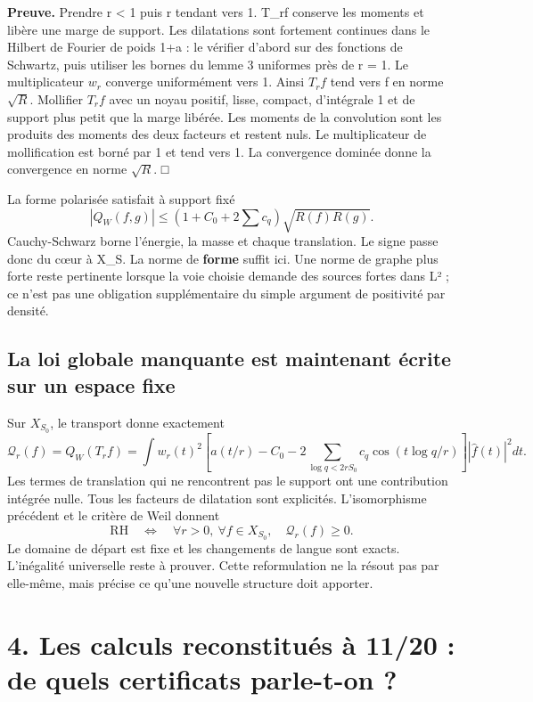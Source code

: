 \documentclass[
  10pt,
  a4paper,
]{article}
\begin{document}
\textbf{Preuve.} Prendre r \textless{} 1 puis r tendant vers 1. T\_rf
conserve les moments et libère une marge de support. Les dilatations
sont fortement continues dans le Hilbert de Fourier de poids 1+a : le
vérifier d'abord sur des fonctions de Schwartz, puis utiliser les bornes
du lemme 3 uniformes près de r = 1. Le multiplicateur \(w_r\) converge
uniformément vers 1. Ainsi \(T_rf\) tend vers f en norme \(\sqrt R\).
Mollifier \(T_rf\) avec un noyau positif, lisse, compact, d'intégrale 1
et de support plus petit que la marge libérée. Les moments de la
convolution sont les produits des moments des deux facteurs et restent
nuls. Le multiplicateur de mollification est borné par 1 et tend vers 1.
La convergence dominée donne la convergence en norme \(\sqrt R\). □

La forme polarisée satisfait à support fixé \[
|Q_W(f,g)|\le(1+C_0+2\sum c_q)\sqrt{R(f)R(g)}.
\] Cauchy-Schwarz borne l'énergie, la masse et chaque translation. Le
signe passe donc du cœur à X\_S. La norme de \textbf{forme} suffit ici.
Une norme de graphe plus forte reste pertinente lorsque la voie choisie
demande des sources fortes dans L² ; ce n'est pas une obligation
supplémentaire du simple argument de positivité par densité.

\hypertarget{la-loi-globale-manquante-est-maintenant-uxe9crite-sur-un-espace-fixe}{%
\subsection{La loi globale manquante est maintenant écrite sur un espace
fixe}\label{la-loi-globale-manquante-est-maintenant-uxe9crite-sur-un-espace-fixe}}

Sur \(X_{S_0}\), le transport donne exactement \[
\mathcal Q_r(f)=Q_W(T_rf)=\int w_r(t)^2
\left[a(t/r)-C_0-2\sum_{\log q<2rS_0}c_q\cos(t\log q/r)\right]
|\widehat f(t)|^2dt.
\] Les termes de translation qui ne rencontrent pas le support ont une
contribution intégrée nulle. Tous les facteurs de dilatation sont
explicités. L'isomorphisme précédent et le critère de Weil donnent \[
\mathrm{RH}\quad\Longleftrightarrow\quad
\forall r>0,\ \forall f\in X_{S_0},\quad \mathcal Q_r(f)\ge0.
\] Le domaine de départ est fixe et les changements de langue sont
exacts. L'inégalité universelle reste à prouver. Cette reformulation ne
la résout pas par elle-même, mais précise ce qu'une nouvelle structure
doit apporter.

\hypertarget{les-calculs-reconstituuxe9s-uxe0-1120-de-quels-certificats-parle-t-on}{%
\section{4. Les calculs reconstitués à 11/20 : de quels certificats
parle-t-on
?}\label{les-calculs-reconstituuxe9s-uxe0-1120-de-quels-certificats-parle-t-on}}
\end{document}
